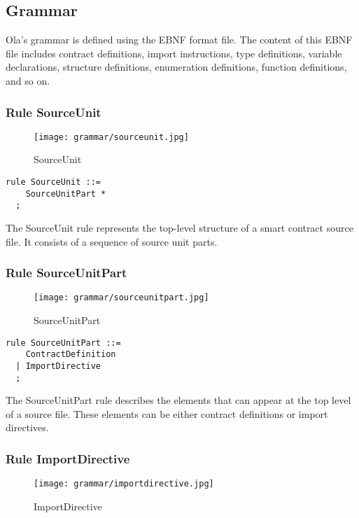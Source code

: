 \subsection{Grammar}\label{section: grammar}

Ola's grammar is defined using the EBNF format file. The content of this EBNF file includes contract definitions, import instructions, type definitions, variable declarations, structure definitions, enumeration definitions, function definitions, and so on.

\subsubsection*{Rule SourceUnit}

\begin{figure}[!ht]
\centering
\texttt{[image: grammar/sourceunit.jpg]}
\caption{SourceUnit}
\end{figure}

\begin{lstlisting}
rule SourceUnit ::=
    SourceUnitPart *  
  ;
\end{lstlisting}

The SourceUnit rule represents the top-level structure of a smart contract source file. It consists of a sequence of source unit parts.

\subsubsection*{Rule SourceUnitPart}

\begin{figure}[!ht]
\centering
\texttt{[image: grammar/sourceunitpart.jpg]}
\caption{SourceUnitPart}
\end{figure}

\begin{lstlisting}
rule SourceUnitPart ::=
    ContractDefinition 
  | ImportDirective 
  ;
\end{lstlisting}

The SourceUnitPart rule describes the elements that can appear at the top level of a source file. These elements can be either contract definitions or import directives.

\subsubsection*{Rule ImportDirective}

\begin{figure}[!ht]
\centering
\texttt{[image: grammar/importdirective.jpg]}
\caption{ImportDirective}
\end{figure}

